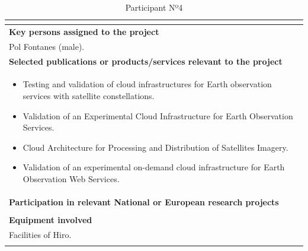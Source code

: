 \begin{longtable}[H]{|p{0.7cm}|p{4cm}|p{7cm}|p{1.3cm}|}
	\multicolumn{4}{|p{14.5cm}|}{}  \\ \hline
	
	\multicolumn{4}{|p{13cm}|}{\textbf{Key persons assigned to the project}}   \\ \hline
	
	\multicolumn{4}{|p{14.5cm}|}{Pol Fontanes (male).}  \\ \hline
	
	\multicolumn{4}{|p{13cm}|}{\textbf{Selected publications or products/services relevant to the project}}  \\ \hline
	
	\multicolumn{4}{|p{14.5cm}|}{
		\begin{itemize}
			\item Testing and validation of cloud infrastructures for Earth observation services with satellite constellations.
			\item Validation of an Experimental Cloud Infrastructure for Earth Observation Services.
			\item Cloud Architecture for Processing and Distribution of Satellites Imagery.
			\item Validation of an experimental on-demand cloud infrastructure for Earth Observation Web Services.
		\end{itemize}}  \\ \hline
	
	\multicolumn{4}{|p{13cm}|}{\textbf{Participation in relevant National or European research projects}}  \\ \hline
	
	\multicolumn{4}{|p{14.5cm}|}{}  \\ \hline
	
	\multicolumn{4}{|p{13cm}|}{\textbf{Equipment involved}}  \\ \hline
	
	\multicolumn{4}{|p{14.5cm}|}{Facilities of Hiro.}  \\ \hline
	\caption{Participant Nº4}
\end{longtable}

